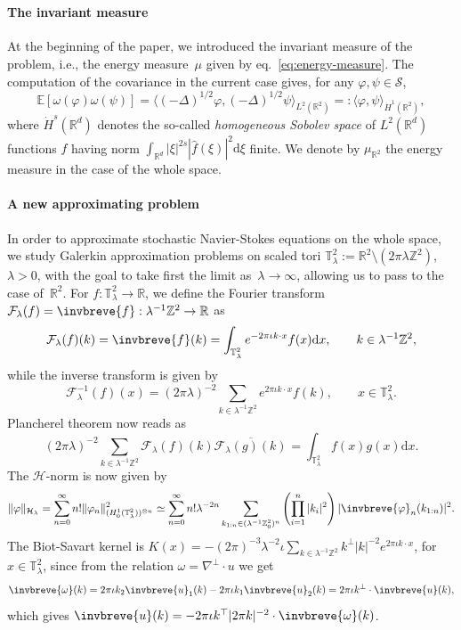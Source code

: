 \documentclass[10pt]{article}
\newcommand{\assign}{:=}
\newcommand{\backassign}{=:}
\newcommand{\mathd}{\mathrm{d}}
\newcommand{\tmem}[1]{{\em #1\/}}
\begin{document}
\

\paragraph{The invariant measure}At the beginning of the paper, we introduced
the invariant measure of the problem, i.e., the energy measure~$\mu$ given by
eq.~{\eqref{eq:energy-measure}}. The computation of the covariance in the
current case gives, for any $\varphi, \psi \in \mathcal{S}$,
\[ \mathbb{E} [\omega (\varphi) \omega (\psi)] = \langle (- \Delta)^{1 / 2}
   \varphi, (- \Delta)^{1 / 2} \psi \rangle_{L^2 (\mathbb{R}^2)} \backassign
   \langle \varphi, \psi \rangle_{\dot{H}^1 (\mathbb{R}^2)}, \]
where $\dot{H}^s (\mathbb{R}^d)$ denotes the so-called {\tmem{homogeneous
Sobolev space}} of $L^2 (\mathbb{R}^d)$ functions $f$ having norm
$\int_{\mathbb{R}^d} | \xi |^{2 s} | \hat{f} (\xi) |^2 \mathd \xi$ finite. We
denote by $\mu_{\mathbb{R}^2}$ the energy measure in the case of the whole
space.

\paragraph{A new approximating problem}In order to approximate stochastic
Navier-Stokes equations on the whole space, we study Galerkin approximation
problems on scaled tori $\mathbb{T}^2_{\lambda} \assign \mathbb{R}^2 \setminus
(2 \pi \lambda \mathbb{Z}^2)$, $\lambda > 0$, with the goal to take first the
limit as~$\lambda \rightarrow \infty$, allowing us to pass to the case
of~$\mathbb{R}^2$. For $f : \mathbb{T}^2_{\lambda} \rightarrow \mathbb{R}$, we
define the Fourier transform $\mathcal{F}_{\lambda} (f) = \invbreve{f} :
\lambda^{- 1} \mathbb{Z}^2 \rightarrow \mathbb{R}$ as
\[ \mathcal{F}_{\lambda} (f) (k) = \invbreve{f} (k) =
   \int_{\mathbb{T}_{\lambda}^2} e^{- 2 \pi \iota k \cdot x} f (x) \mathd x,
   \qquad k \in \lambda^{- 1} \mathbb{Z}^2, \]
while the inverse transform is given by
\[ \mathcal{F}_{\lambda}^{- 1} (f) (x) = (2 \pi \lambda)^{- 2} \sum_{k \in
   \lambda^{- 1} \mathbb{Z}^2} e^{2 \pi \iota k \cdot x} f (k), \qquad x \in
   \mathbb{T}^2_{\lambda} . \]
Plancherel theorem now reads as
\[ (2 \pi \lambda)^{- 2} \sum_{k \in \lambda^{- 1} \mathbb{Z}^2}
   \mathcal{F}_{\lambda} (f) (k)  \overline{\mathcal{F}_{\lambda} (g) (k)_{}}
   = \int_{\mathbb{T}_{\lambda}^2} f (x) g (x) \mathd x. \]
The $\mathcal{H}$-norm is now given by
\[ \| \varphi \|_{\mathcal{H}_{\lambda}} = \sum_{n = 0}^{\infty} n! \|
   \varphi_n \|^2_{(H^1_0 (\mathbb{T}_{\lambda}^2))^{\otimes n}} \simeq
   \sum_{n = 0}^{\infty} n! \lambda^{- 2 n} \sum_{k_{1 : n} \in (\lambda^{- 1}
   \mathbb{Z}^2_0)^n} \left( \prod_{i = 1}^n | k_i |^2  \right)  |
   \invbreve{\varphi}_n (k_{1 : n}) |^2 . \]
The Biot-Savart kernel is $K (x) = - (2 \pi)^{- 3} \lambda^{- 2} \iota \sum_{k
\in \lambda^{- 1} \mathbb{Z}^2} k^{\bot} | k |^{- 2} e^{2 \pi \iota k \cdot
x}$, for $x \in \mathbb{T}^2_{\lambda}$, since from the relation $\omega =
\nabla^{\bot} \cdot u$ we get
\[ \invbreve{\omega} (k) = 2 \pi \iota k_2  \invbreve{u}_1 (k) - 2 \pi \iota
   k_1  \invbreve{u}_2 (k) = 2 \pi \iota k^{\bot} \cdot \invbreve{u} (k), \]
which gives $\invbreve{u} (k) = - 2 \pi \iota k^{\top} | 2 \pi k |^{- 2} \cdot
\invbreve{\omega} (k)$.
\end{document}
